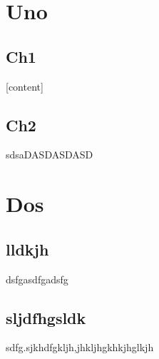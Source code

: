 \documentclass[a4paper, 11pt]{report}
\begin{document}
\makedocumenttitlepage

\tableofcontents

\part{Uno}

\chapter{Ch1}
[content]

\chapter{Ch2}
sdsaDASDASDASD

\part{Dos}

\chapter{lldkjh}
dsfgasdfgadsfg

\chapter{sljdfhgsldk}

sdfg.sjkhdfgkljh,jhkljhgkhkjhglkjh


\makedocumentbackpage
\end{document}
